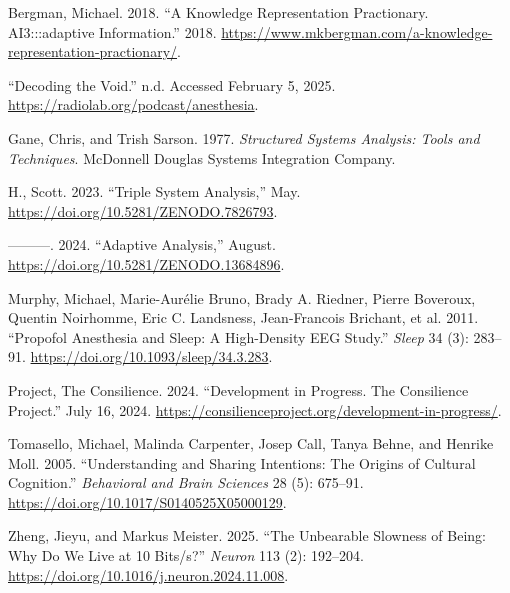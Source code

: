 \label{refs}
\begin{CSLReferences}{1}{0}
Bergman, Michael. 2018. {``A Knowledge Representation Practionary.
{AI}3:::adaptive Information.''} 2018.
\url{https://www.mkbergman.com/a-knowledge-representation-practionary/}.

{``Decoding the Void.''} n.d. Accessed February 5, 2025.
\url{https://radiolab.org/podcast/anesthesia}.

Gane, Chris, and Trish Sarson. 1977. \emph{Structured Systems Analysis:
Tools and Techniques}. {McDonnell} Douglas Systems Integration Company.

H., Scott. 2023. {``Triple System Analysis,''} May.
\url{https://doi.org/10.5281/ZENODO.7826793}.

---------. 2024. {``Adaptive Analysis,''} August.
\url{https://doi.org/10.5281/ZENODO.13684896}.

Murphy, Michael, Marie-Aurélie Bruno, Brady A. Riedner, Pierre Boveroux,
Quentin Noirhomme, Eric C. Landsness, Jean-Francois Brichant, et al.
2011. {``Propofol Anesthesia and Sleep: A High-Density {EEG} Study.''}
\emph{Sleep} 34 (3): 283--91.
\url{https://doi.org/10.1093/sleep/34.3.283}.

Project, The Consilience. 2024. {``Development in Progress. The
Consilience Project.''} July 16, 2024.
\url{https://consilienceproject.org/development-in-progress/}.

Tomasello, Michael, Malinda Carpenter, Josep Call, Tanya Behne, and
Henrike Moll. 2005. {``Understanding and Sharing Intentions: The Origins
of Cultural Cognition.''} \emph{Behavioral and Brain Sciences} 28 (5):
675--91. \url{https://doi.org/10.1017/S0140525X05000129}.

Zheng, Jieyu, and Markus Meister. 2025. {``The Unbearable Slowness of
Being: Why Do We Live at 10 Bits/s?''} \emph{Neuron} 113 (2): 192--204.
\url{https://doi.org/10.1016/j.neuron.2024.11.008}.

\end{CSLReferences}

\newpage

\hfill\break

\newpage
